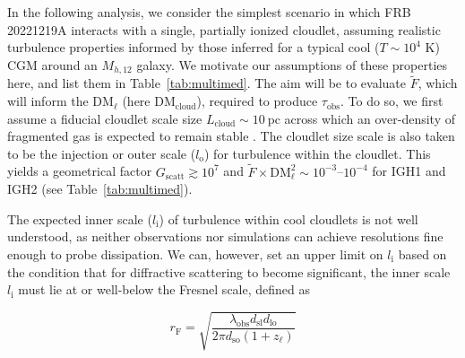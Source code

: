 \documentclass[twocolumn, linenumbers, tra]{aastex631}
\newcommand{\nihari}{FRB\,20221219A } %
\begin{document}
{In the following analysis, we consider the simplest scenario in which \nihari interacts with a single, partially ionized cloudlet, assuming realistic turbulence properties informed by those inferred for a typical cool ($T \sim 10^{4}$ K) CGM around an $M_{h,12}$ galaxy. We motivate our assumptions of these properties here, and list them in Table~\ref{tab:multimed}. The aim will be to evaluate $\widetilde{F}$, which will inform the $\mathrm{DM}_{\ell}$ (here $\mathrm{DM_{\mathrm{cloud}}}$), required to produce $\tau_{\mathrm{obs}}$. To do so, we first assume a fiducial cloudlet scale size $L_\mathrm{cloud} \sim 10\ \mathrm{pc}$ across which an over-density of fragmented gas is expected to remain stable \citep{McCourt2018}. The cloudlet size scale is also taken to be the injection or outer scale ($l_\mathrm{o}$) for turbulence within the cloudlet. This yields a geometrical factor $G_{\mathrm{scatt}} \gtrsim 10^7$ and $\widetilde{F} \times \mathrm{DM}_{\ell}^2 \sim 10^{-3}$--$10^{-4}$ for IGH1 and IGH2 (see Table~\ref{tab:multimed}). 

The expected inner scale ($l_{\mathrm{i}}$) of turbulence within cool cloudlets is not well understood, as neither observations nor simulations can achieve resolutions fine enough to probe dissipation. We can, however, set an upper limit on $l_\mathrm{i}$ based on the condition that for diffractive scattering to become significant, the inner scale $l_\mathrm{i}$ must lie at or well-below the Fresnel scale, defined as}

\begin{equation}\label{eq:fresnel}
  r_{\mathrm{F}} = \sqrt{\frac{\lambda_{\mathrm{obs}} d_{\mathrm{sl}} d_{\mathrm{lo}}}{2 \pi d_{\mathrm{so}} {(1+z_{\ell})}}}
\end{equation}
\end{document}
